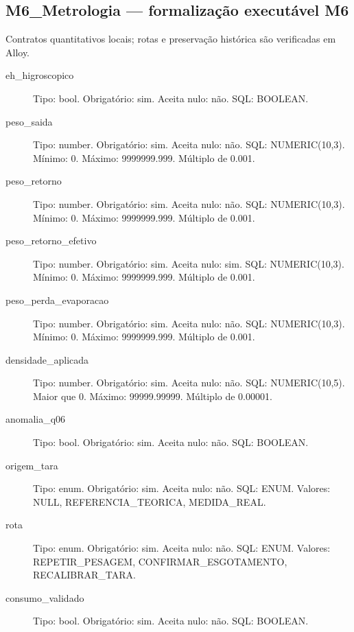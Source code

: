 \subsection*{M6\_Metrologia --- formalização executável M6}
Contratos quantitativos locais; rotas e preservação histórica são verificadas em Alloy.
\begin{description}
\item[eh\_higroscopico] Tipo: bool. Obrigatório: sim. Aceita nulo: não.
SQL: BOOLEAN.
\item[peso\_saida] Tipo: number. Obrigatório: sim. Aceita nulo: não.
SQL: NUMERIC(10,3).
Mínimo: 0.
Máximo: 9999999.999.
Múltiplo de 0.001.
\item[peso\_retorno] Tipo: number. Obrigatório: sim. Aceita nulo: não.
SQL: NUMERIC(10,3).
Mínimo: 0.
Máximo: 9999999.999.
Múltiplo de 0.001.
\item[peso\_retorno\_efetivo] Tipo: number. Obrigatório: sim. Aceita nulo: sim.
SQL: NUMERIC(10,3).
Mínimo: 0.
Máximo: 9999999.999.
Múltiplo de 0.001.
\item[peso\_perda\_evaporacao] Tipo: number. Obrigatório: sim. Aceita nulo: não.
SQL: NUMERIC(10,3).
Mínimo: 0.
Máximo: 9999999.999.
Múltiplo de 0.001.
\item[densidade\_aplicada] Tipo: number. Obrigatório: sim. Aceita nulo: não.
SQL: NUMERIC(10,5).
Maior que 0.
Máximo: 99999.99999.
Múltiplo de 0.00001.
\item[anomalia\_q06] Tipo: bool. Obrigatório: sim. Aceita nulo: não.
SQL: BOOLEAN.
\item[origem\_tara] Tipo: enum. Obrigatório: sim. Aceita nulo: não.
SQL: ENUM.
Valores: NULL, REFERENCIA\_TEORICA, MEDIDA\_REAL.
\item[rota] Tipo: enum. Obrigatório: sim. Aceita nulo: não.
SQL: ENUM.
Valores: REPETIR\_PESAGEM, CONFIRMAR\_ESGOTAMENTO, RECALIBRAR\_TARA.
\item[consumo\_validado] Tipo: bool. Obrigatório: sim. Aceita nulo: não.
SQL: BOOLEAN.
\end{description}
